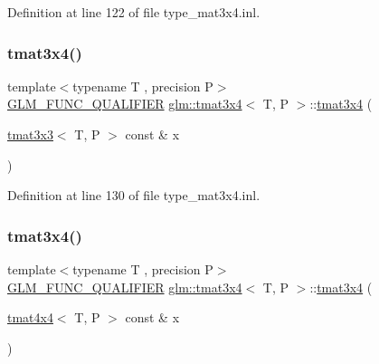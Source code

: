 Definition at line 122 of file type\+\_\+mat3x4.\+inl.

\mbox{\label{structglm_1_1tmat3x4_a03d2fae8e2bee08e4cff77f26f674be8}} 
\subsubsection{\texorpdfstring{tmat3x4()}{tmat3x4()}\hspace{0.1cm}{\footnotesize\ttfamily [12/22]}}
{\footnotesize\ttfamily template$<$typename T , precision P$>$ \\
\mbox{\hyperlink{setup_8hpp_a33fdea6f91c5f834105f7415e2a64407}{G\+L\+M\+\_\+\+F\+U\+N\+C\+\_\+\+Q\+U\+A\+L\+I\+F\+I\+ER}} \mbox{\hyperlink{structglm_1_1tmat3x4}{glm\+::tmat3x4}}$<$ T, P $>$\+::\mbox{\hyperlink{structglm_1_1tmat3x4}{tmat3x4}} (\begin{DoxyParamCaption}\item[{\mbox{\hyperlink{structglm_1_1tmat3x3}{tmat3x3}}$<$ T, P $>$ const \&}]{x }\end{DoxyParamCaption})}



Definition at line 130 of file type\+\_\+mat3x4.\+inl.

\mbox{\label{structglm_1_1tmat3x4_af6107faa14e8655813db0fc464242ae9}} 
\subsubsection{\texorpdfstring{tmat3x4()}{tmat3x4()}\hspace{0.1cm}{\footnotesize\ttfamily [13/22]}}
{\footnotesize\ttfamily template$<$typename T , precision P$>$ \\
\mbox{\hyperlink{setup_8hpp_a33fdea6f91c5f834105f7415e2a64407}{G\+L\+M\+\_\+\+F\+U\+N\+C\+\_\+\+Q\+U\+A\+L\+I\+F\+I\+ER}} \mbox{\hyperlink{structglm_1_1tmat3x4}{glm\+::tmat3x4}}$<$ T, P $>$\+::\mbox{\hyperlink{structglm_1_1tmat3x4}{tmat3x4}} (\begin{DoxyParamCaption}\item[{\mbox{\hyperlink{structglm_1_1tmat4x4}{tmat4x4}}$<$ T, P $>$ const \&}]{x }\end{DoxyParamCaption})}



